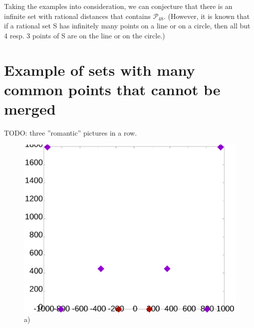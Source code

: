 \documentclass[12pt]{article}
\theoremstyle{theorem}
\theoremstyle{dfn}
\theoremstyle{remark}
\begin{document}
Taking the examples into consideration,
we can conjecture that there is an infinite set with rational distances
that contains $\mathcal{P_48}$.
(However, it is known that\cite{solymosi2010question}
if a rational set S has infinitely many points on a line or on a circle,
then all but 4 resp. 3 points of S are on the line or on the circle.)


\section{Example of sets with many common points that cannot be merged}

TODO: three ''romantic'' pictures in a row.

\begin{figure}[h!]
	\begin{minipage}[h]{0.32\linewidth}
		\begin{center}
			\includegraphics[width=1\linewidth]{./img/8_2520_143_symm1.png}\\ a)
		\end{center}
	\end{minipage}
	\hfill
	\begin{minipage}[h]{0.32\linewidth}
		\begin{center}

\end{center}
\end{minipage}
\end{figure}
\end{document}
